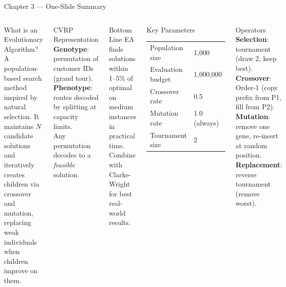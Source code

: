 \documentclass[aspectratio=169,10pt]{beamer}
\begin{document}
\begin{frame}{Chapter 3 — One-Slide Summary}

  \begin{columns}
    \begin{block}{What is an Evolutionary Algorithm?}
      A population-based search method inspired by natural selection.
      It maintains $N$ candidate solutions and iteratively creates children
      via crossover and mutation, replacing weak individuals when children improve on them.
    \end{block}
    \vspace{0.5em}
    \begin{block}{CVRP Representation}
      \textbf{Genotype}: permutation of customer IDs (grand tour).\\
      \textbf{Phenotype}: routes decoded by splitting at capacity limits.\\
      Any permutation decodes to a \emph{feasible} solution.
    \end{block}
    \vspace{0.5em}
    \begin{alertblock}{Bottom Line}
      EA finds solutions within 1--5\% of optimal on medium instances
      in practical time.  Combine with Clarke-Wright for best real-world results.
    \end{alertblock}

    \begin{block}{Key Parameters}
      \begin{tabular}{ll}
        Population size    & 1{,}000 \\
        Evaluation budget  & 1{,}000{,}000 \\
        Crossover rate     & 0.5 \\
        Mutation rate      & 1.0 (always) \\
        Tournament size    & 2 \\
      \end{tabular}
    \end{block}
    \vspace{0.5em}
    \begin{block}{Operators}
      \textbf{Selection}: tournament (draw 2, keep best).\\
      \textbf{Crossover}: Order-1 (copy prefix from P1, fill from P2).\\
      \textbf{Mutation}: remove one gene, re-insert at random position.\\
      \textbf{Replacement}: reverse tournament (remove worst).
    \end{block}
  \end{columns}

\end{frame}
\end{document}
